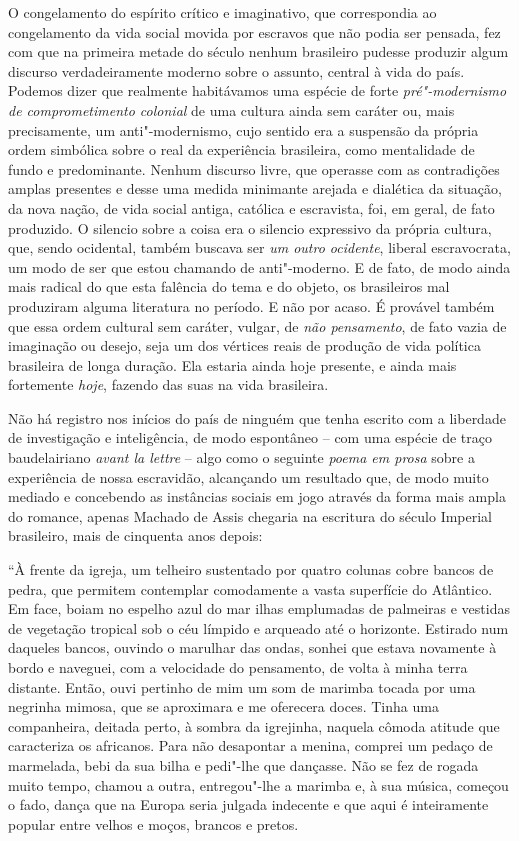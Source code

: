 O congelamento do espírito crítico e imaginativo, que correspondia ao
congelamento da vida social movida por escravos que não podia ser
pensada, fez com que na primeira metade do século  nenhum brasileiro
pudesse produzir algum discurso verdadeiramente moderno sobre o assunto,
central à vida do país. Podemos dizer que realmente habitávamos uma
espécie de forte \emph{pré"-modernismo de comprometimento colonial} de uma cultura ainda sem caráter ou, mais precisamente,
um anti"-modernismo, cujo sentido era a suspensão da própria ordem
simbólica sobre o real da experiência brasileira, como mentalidade de
fundo e predominante. Nenhum discurso livre, que operasse com as
contradições amplas presentes e desse uma medida minimante arejada e
dialética da situação, da nova nação, de vida social antiga, católica e
escravista, foi, em geral, de fato produzido. O silencio sobre a coisa
era o silencio expressivo da própria cultura, que, sendo ocidental,
também buscava ser \emph{um outro ocidente}, liberal escravocrata, um
modo de ser que estou chamando de anti"-moderno. E de fato, de modo ainda
mais radical do que esta falência do tema e do objeto, os brasileiros
mal produziram alguma literatura no período. E não por acaso. É provável
também que essa ordem cultural sem caráter, vulgar, de \emph{não
pensamento}, de fato vazia de imaginação ou desejo, seja um dos vértices
reais de produção de vida política brasileira de longa duração. Ela
estaria ainda hoje presente, e ainda mais fortemente \emph{hoje},
fazendo das suas na vida brasileira.

Não há registro nos inícios do país de ninguém que tenha escrito com a
liberdade de investigação e inteligência, de modo espontâneo -- com uma
espécie de traço baudelairiano \emph{avant la lettre} -- algo como o
seguinte \emph{poema em prosa} sobre a experiência de nossa escravidão,
alcançando um resultado que, de modo muito mediado e concebendo as
instâncias sociais em jogo através da forma mais ampla do romance,
apenas Machado de Assis chegaria na escritura do século Imperial
brasileiro, mais de cinquenta anos depois:

``À frente da igreja, um telheiro sustentado por quatro colunas cobre
bancos de pedra, que permitem contemplar comodamente a vasta superfície
do Atlântico. Em face, boiam no espelho azul do mar ilhas emplumadas de
palmeiras e vestidas de vegetação tropical sob o céu límpido e arqueado
até o horizonte. Estirado num daqueles bancos, ouvindo o marulhar das
ondas, sonhei que estava novamente à bordo e naveguei, com a velocidade
do pensamento, de volta à minha terra distante. Então, ouvi pertinho de
mim um som de marimba tocada por uma negrinha mimosa, que se aproximara
e me oferecera doces. Tinha uma companheira, deitada perto, à sombra da
igrejinha, naquela cômoda atitude que caracteriza os africanos. Para não
desapontar a menina, comprei um pedaço de marmelada, bebi da sua bilha e
pedi"-lhe que dançasse. Não se fez de rogada muito tempo, chamou a outra,
entregou"-lhe a marimba e, à sua música, começou o fado, dança que na
Europa seria julgada indecente e que aqui é inteiramente popular entre
velhos e moços, brancos e pretos.

